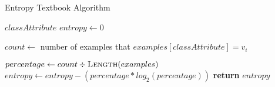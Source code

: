 \begin{algorithm}[H]
\caption{Entropy Textbook Algorithm}\label{a:id3-entropy-simple}
\begin{algorithmic}[1]
\renewcommand{\algorithmicrequire}{\textbf{Global Vars:}}
\Require $classAttribute$
    \State $entropy \gets 0$

        \State $count \gets$ {\small number of examples that} $examples[classAttribute] = v_i$

        \State $percentage \gets count \div \textsc{Length}(examples)$
            \State $entropy \gets entropy - (percentage * log_2 (percentage))$
        \EndIf
    \EndFor
    \State \textbf{return} $entropy$
\EndProcedure
\end{algorithmic}
\end{algorithm}
